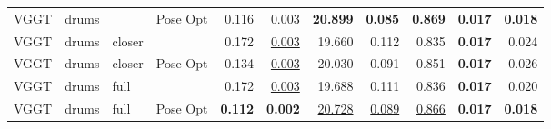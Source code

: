 \begin{table}[H]
\begin{tabular}{llllrrrrrrr}
VGGT & drums &  & Pose Opt & \underline{0.116} & \underline{0.003} & \textbf{20.899} & \textbf{0.085} & \textbf{0.869} & \textbf{0.017} & \textbf{0.018} \\
VGGT & drums & closer &  & 0.172 & \underline{0.003} & 19.660 & 0.112 & 0.835 & \textbf{0.017} & 0.024 \\
VGGT & drums & closer & Pose Opt & 0.134 & \underline{0.003} & 20.030 & 0.091 & 0.851 & \textbf{0.017} & 0.026 \\
VGGT & drums & full &  & 0.172 & \underline{0.003} & 19.688 & 0.111 & 0.836 & \textbf{0.017} & 0.020 \\
VGGT & drums & full & Pose Opt & \textbf{0.112} & \textbf{0.002} & \underline{20.728} & \underline{0.089} & \underline{0.866} & \textbf{0.017} & \textbf{0.018} \\
\bottomrule
\end{tabular}
\end{table}